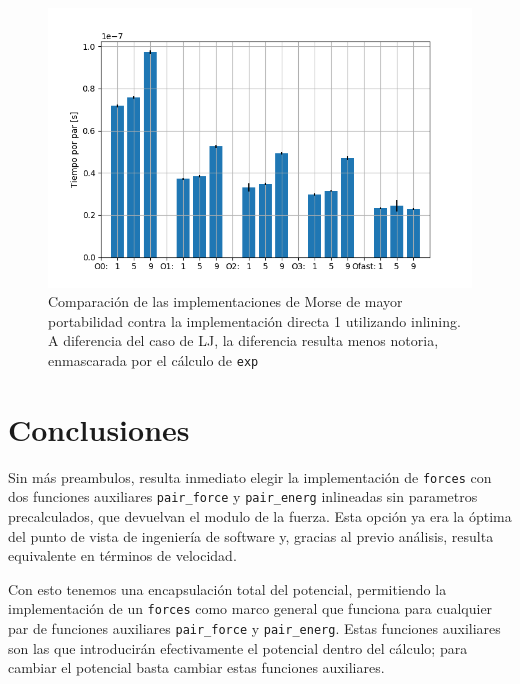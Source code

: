 \documentclass[twoside, 12pt]{article}
\begin{document}
\begin{figure}[h]
	\centering
	\includegraphics[trim = 10mm 5mm 10mm 5mm, clip, width=0.6\columnwidth]{Comp_tiempos_morse_inline.png}
	\caption{Comparaci\'on de las implementaciones de Morse de mayor portabilidad contra la implementaci\'on directa 1 utilizando inlining. A diferencia del caso de LJ, la diferencia resulta menos notoria, enmascarada por el c\'alculo de \texttt{exp}}
	\label{fig:CompEsp_morse_inline}
\end{figure}

\section{Conclusiones}

Sin m\'as preambulos, resulta inmediato elegir la implementaci\'on de \texttt{forces} con dos funciones auxiliares \texttt{pair\_force} y \texttt{pair\_energ} inlineadas sin parametros precalculados, que devuelvan el modulo de la fuerza. Esta opci\'on ya era la \'optima del punto de vista de ingenier\'ia de software y, gracias al previo an\'alisis, resulta equivalente en t\'erminos de velocidad.

Con esto tenemos una encapsulación total del potencial, permitiendo la implementaci\'on de un \texttt{forces} como marco general que funciona para cualquier par de funciones auxiliares \texttt{pair\_force} y \texttt{pair\_energ}. Estas funciones auxiliares son las que introducir\'an efectivamente el potencial dentro del c\'alculo; para cambiar el potencial basta cambiar estas funciones auxiliares.
\end{document}
